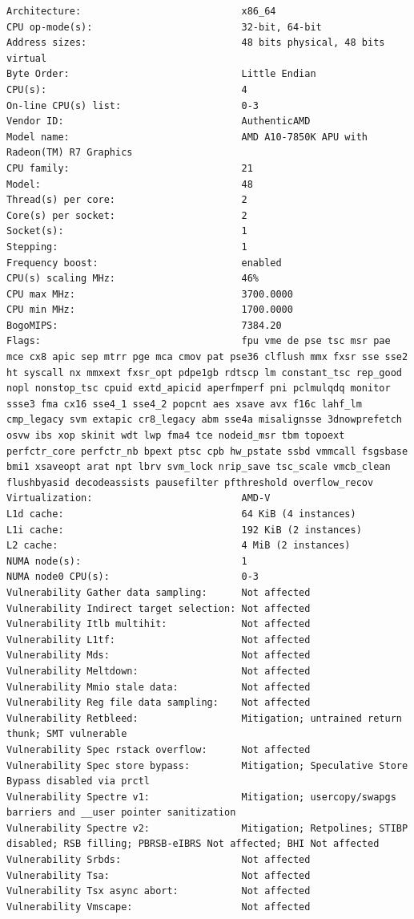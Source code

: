 \begin{lstlisting}[caption={Ausagbe von lscpu und lscpu --caches des AMD A10-7850K APU}]
Architecture:                            x86_64
CPU op-mode(s):                          32-bit, 64-bit
Address sizes:                           48 bits physical, 48 bits virtual
Byte Order:                              Little Endian
CPU(s):                                  4
On-line CPU(s) list:                     0-3
Vendor ID:                               AuthenticAMD
Model name:                              AMD A10-7850K APU with Radeon(TM) R7 Graphics
CPU family:                              21
Model:                                   48
Thread(s) per core:                      2
Core(s) per socket:                      2
Socket(s):                               1
Stepping:                                1
Frequency boost:                         enabled
CPU(s) scaling MHz:                      46%
CPU max MHz:                             3700.0000
CPU min MHz:                             1700.0000
BogoMIPS:                                7384.20
Flags:                                   fpu vme de pse tsc msr pae mce cx8 apic sep mtrr pge mca cmov pat pse36 clflush mmx fxsr sse sse2 ht syscall nx mmxext fxsr_opt pdpe1gb rdtscp lm constant_tsc rep_good nopl nonstop_tsc cpuid extd_apicid aperfmperf pni pclmulqdq monitor ssse3 fma cx16 sse4_1 sse4_2 popcnt aes xsave avx f16c lahf_lm cmp_legacy svm extapic cr8_legacy abm sse4a misalignsse 3dnowprefetch osvw ibs xop skinit wdt lwp fma4 tce nodeid_msr tbm topoext perfctr_core perfctr_nb bpext ptsc cpb hw_pstate ssbd vmmcall fsgsbase bmi1 xsaveopt arat npt lbrv svm_lock nrip_save tsc_scale vmcb_clean flushbyasid decodeassists pausefilter pfthreshold overflow_recov
Virtualization:                          AMD-V
L1d cache:                               64 KiB (4 instances)
L1i cache:                               192 KiB (2 instances)
L2 cache:                                4 MiB (2 instances)
NUMA node(s):                            1
NUMA node0 CPU(s):                       0-3
Vulnerability Gather data sampling:      Not affected
Vulnerability Indirect target selection: Not affected
Vulnerability Itlb multihit:             Not affected
Vulnerability L1tf:                      Not affected
Vulnerability Mds:                       Not affected
Vulnerability Meltdown:                  Not affected
Vulnerability Mmio stale data:           Not affected
Vulnerability Reg file data sampling:    Not affected
Vulnerability Retbleed:                  Mitigation; untrained return thunk; SMT vulnerable
Vulnerability Spec rstack overflow:      Not affected
Vulnerability Spec store bypass:         Mitigation; Speculative Store Bypass disabled via prctl
Vulnerability Spectre v1:                Mitigation; usercopy/swapgs barriers and __user pointer sanitization
Vulnerability Spectre v2:                Mitigation; Retpolines; STIBP disabled; RSB filling; PBRSB-eIBRS Not affected; BHI Not affected
Vulnerability Srbds:                     Not affected
Vulnerability Tsa:                       Not affected
Vulnerability Tsx async abort:           Not affected
Vulnerability Vmscape:                   Not affected


\end{lstlisting}
